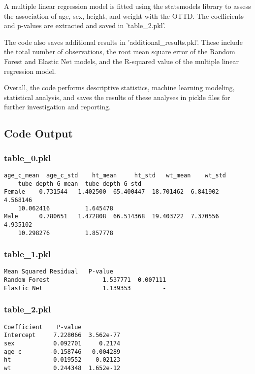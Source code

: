 \documentclass[11pt]{article}
\begin{document}
A multiple linear regression model is fitted using the statsmodels library to assess the association of age, sex, height, and weight with the OTTD. The coefficients and p-values are extracted and saved in 'table\_2.pkl'.

The code also saves additional results in 'additional\_results.pkl'. These include the total number of observations, the root mean square error of the Random Forest and Elastic Net models, and the R-squared value of the multiple linear regression model.

Overall, the code performs descriptive statistics, machine learning modeling, statistical analysis, and saves the results of these analyses in pickle files for further investigation and reporting.

\subsection{Code Output}

\subsubsection*{table\_0.pkl}

\begin{Verbatim}[tabsize=4]
        age_c_mean  age_c_std    ht_mean     ht_std   wt_mean    wt_std
	tube_depth_G_mean  tube_depth_G_std
Female    0.731544   1.402500  65.400447  18.701462  6.841902  4.568146
	10.062416          1.645478
Male      0.780651   1.472808  66.514368  19.403722  7.370556  4.935102
	10.298276          1.857778
\end{Verbatim}

\subsubsection*{table\_1.pkl}

\begin{Verbatim}[tabsize=4]
               Mean Squared Residual   P-value
Random Forest               1.537771  0.007111
Elastic Net                 1.139353         -
\end{Verbatim}

\subsubsection*{table\_2.pkl}

\begin{Verbatim}[tabsize=4]
           Coefficient    P-value
Intercept     7.228066  3.562e-77
sex           0.092701     0.2174
age_c        -0.158746   0.004289
ht            0.019552    0.02123
wt            0.244348  1.652e-12
\end{Verbatim}
\end{document}
